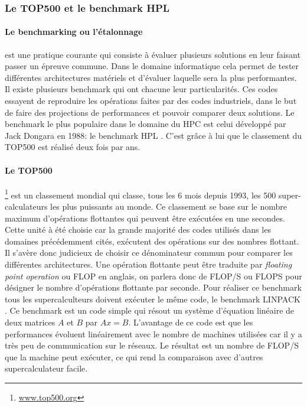 






\subsubsection{Le TOP500 et le benchmark HPL}

\paragraph{Le benchmarking ou l'étalonnage} est une pratique courante qui consiste à évaluer plusieurs solutions en leur faisant passer un épreuve commune. Dans le domaine informatique cela permet de tester différentes architectures matériels et d'évaluer laquelle sera la plus performantes. Il existe plusieurs benchmark qui ont chacune leur particularités. Ces codes essayent de reproduire les opérations faites par des codes industriels, dans le but de faire des projections de performances et pouvoir comparer deux solutions. Le benchmark le plus populaire dans le domaine du HPC est celui développé par Jack Dongara en 1988: le benchmark HPL \cite{Dongarra}. C'est grâce à lui que le classement du TOP500 est réalisé deux fois par ans.


\paragraph{Le TOP500} \footnote{\url{www.top500.org}} est un classement mondial qui classe, tous les 6 mois depuis 1993, les 500 super-calculateurs les plus puissants au monde. Ce classement se base sur le nombre maximum d'opérations flottantes qui peuvent être exécutées en une secondes. Cette unité à été choisie car la grande majorité des codes utilisés dans les domaines précédemment cités, exécutent des opérations sur des nombres flottant. Il s'avère donc judicieux de choisir ce dénominateur commun pour comparer les différentes architectures.  Une opération flottante peut être traduite par \textit{floating point operation} ou FLOP en anglais, on parlera donc de FLOP/S ou FLOPS pour désigner le nombre d'opérations flottante par seconde. Pour réaliser ce benchmark tous les supercalculteurs doivent exécuter le même code, le benchmark LINPACK \cite{Dongarra} \cite{450b1baca0774fd0976ff739b90bed04}. Ce benchmark est un code simple qui résout un système d'équation linéaire de deux matrices $A$ et $B$ par $Ax = B$. L'avantage de ce code est que les performances évoluent linéairement avec le nombre de machines utilisées car il y a très peu de communication sur le réseaux. Le résultat est un nombre de FLOP/S que la machine peut exécuter, ce qui rend la comparaison avec d'autres supercalculateur facile. 



